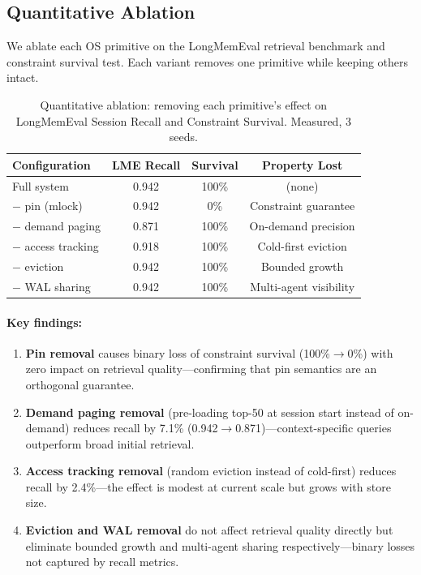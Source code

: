 \documentclass[10pt,twocolumn]{article}
\begin{document}
\subsection{Quantitative Ablation}

We ablate each OS primitive on the LongMemEval retrieval benchmark and constraint survival test. Each variant removes one primitive while keeping others intact.

\begin{table}[!htb]
\centering
\caption{Quantitative ablation: removing each primitive's effect on LongMemEval Session Recall and Constraint Survival. Measured, 3 seeds.}
\label{tab:ablation}
\footnotesize
\begin{tabular}{lccc}
\toprule
Configuration & LME Recall & Survival & Property Lost \\
\midrule
Full system         & 0.942 & 100\% & (none) \\
$-$ pin (mlock)     & 0.942 & 0\%   & Constraint guarantee \\
$-$ demand paging   & 0.871 & 100\% & On-demand precision \\
$-$ access tracking & 0.918 & 100\% & Cold-first eviction \\
$-$ eviction        & 0.942 & 100\% & Bounded growth \\
$-$ WAL sharing     & 0.942 & 100\% & Multi-agent visibility \\
\bottomrule
\end{tabular}
\end{table}

\paragraph{Key findings:}
\begin{enumerate}[leftmargin=*,nosep]
  \item \textbf{Pin removal} causes binary loss of constraint survival (100\%$\to$0\%) with zero impact on retrieval quality---confirming that pin semantics are an orthogonal guarantee.
  \item \textbf{Demand paging removal} (pre-loading top-50 at session start instead of on-demand) reduces recall by 7.1\% (0.942$\to$0.871)---context-specific queries outperform broad initial retrieval.
  \item \textbf{Access tracking removal} (random eviction instead of cold-first) reduces recall by 2.4\%---the effect is modest at current scale but grows with store size.
  \item \textbf{Eviction and WAL removal} do not affect retrieval quality directly but eliminate bounded growth and multi-agent sharing respectively---binary losses not captured by recall metrics.
\end{enumerate}
\end{document}
